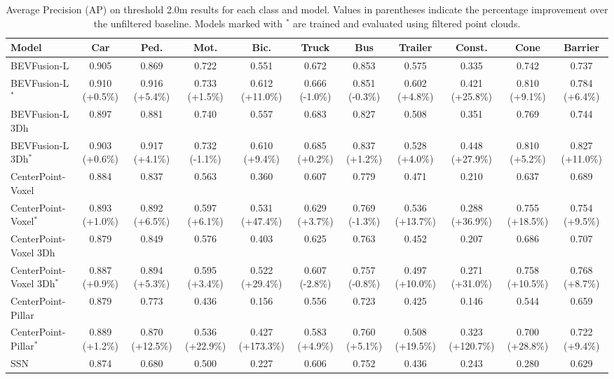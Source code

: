 
\begin{table}[htpb]
    \caption{Average Precision (AP) on threshold 2.0m results for each class and model. Values in parentheses indicate the percentage improvement over the unfiltered baseline. Models marked with $^*$ are trained and evaluated using filtered point clouds.}
    \centering
    \begin{tabular}{lcccccccccc}
    \midrule
    Model & Car & Ped. & Mot. & Bic. & Truck & Bus & Trailer & Const. & Cone & Barrier \\
    \midrule
    BEVFusion-L & 0.905 & 0.869 & 0.722 & 0.551 & 0.672 & 0.853 & 0.575 & 0.335 & 0.742 & 0.737 \\
    BEVFusion-L$^*$ & 0.910 (+0.5\%) & 0.916 (+5.4\%) & 0.733 (+1.5\%) & 0.612 (+11.0\%) & 0.666 (-1.0\%) & 0.851 (-0.3\%) & 0.602 (+4.8\%) & 0.421 (+25.8\%) & 0.810 (+9.1\%) & 0.784 (+6.4\%) \\
    \midrule
    BEVFusion-L 3Dh & 0.897 & 0.881 & 0.740 & 0.557 & 0.683 & 0.827 & 0.508 & 0.351 & 0.769 & 0.744 \\
    BEVFusion-L 3Dh$^*$ & 0.903 (+0.6\%) & 0.917 (+4.1\%) & 0.732 (-1.1\%) & 0.610 (+9.4\%) & 0.685 (+0.2\%) & 0.837 (+1.2\%) & 0.528 (+4.0\%) & 0.448 (+27.9\%) & 0.810 (+5.2\%) & 0.827 (+11.0\%) \\
    \midrule
    CenterPoint-Voxel & 0.884 & 0.837 & 0.563 & 0.360 & 0.607 & 0.779 & 0.471 & 0.210 & 0.637 & 0.689 \\
    CenterPoint-Voxel$^*$ & 0.893 (+1.0\%) & 0.892 (+6.5\%) & 0.597 (+6.1\%) & 0.531 (+47.4\%) & 0.629 (+3.7\%) & 0.769 (-1.3\%) & 0.536 (+13.7\%) & 0.288 (+36.9\%) & 0.755 (+18.5\%) & 0.754 (+9.5\%) \\
    \midrule
    CenterPoint-Voxel 3Dh & 0.879 & 0.849 & 0.576 & 0.403 & 0.625 & 0.763 & 0.452 & 0.207 & 0.686 & 0.707 \\
    CenterPoint-Voxel 3Dh$^*$ & 0.887 (+0.9\%) & 0.894 (+5.3\%) & 0.595 (+3.4\%) & 0.522 (+29.4\%) & 0.607 (-2.8\%) & 0.757 (-0.8\%) & 0.497 (+10.0\%) & 0.271 (+31.0\%) & 0.758 (+10.5\%) & 0.768 (+8.7\%) \\
    \midrule
    CenterPoint-Pillar & 0.879 & 0.773 & 0.436 & 0.156 & 0.556 & 0.723 & 0.425 & 0.146 & 0.544 & 0.659 \\
    CenterPoint-Pillar$^*$ & 0.889 (+1.2\%) & 0.870 (+12.5\%) & 0.536 (+22.9\%) & 0.427 (+173.3\%) & 0.583 (+4.9\%) & 0.760 (+5.1\%) & 0.508 (+19.5\%) & 0.323 (+120.7\%) & 0.700 (+28.8\%) & 0.722 (+9.4\%) \\
    \midrule
    SSN & 0.874 & 0.680 & 0.500 & 0.227 & 0.606 & 0.752 & 0.436 & 0.243 & 0.280 & 0.629 \\

\end{tabular}
\end{table}

